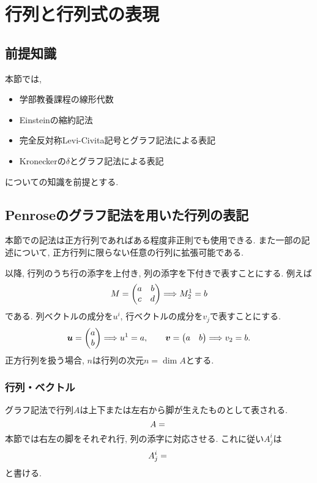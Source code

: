 \documentclass[dvipdfmx]{jsarticle}
\begin{document}
\section{行列と行列式の表現}
\label{sec: matrix}

\subsection{前提知識}

本節では,
\begin{itemize}
    \item 学部教養課程の線形代数
    \item Einsteinの縮約記法
    \item 完全反対称Levi-Civita記号とグラフ記法による表記
    \item Kroneckerの$\delta$とグラフ記法による表記
\end{itemize}
についての知識を前提とする.


\subsection{Penroseのグラフ記法を用いた行列の表記}
\label{sec: matrix: display of matrix}

本節での記法は正方行列であればある程度非正則でも使用できる.
また一部の記述について, 正方行列に限らない任意の行列に拡張可能である.

以降, 行列のうち行の添字を上付き, 列の添字を下付きで表すことにする.
例えば
\begin{align*}
    M=\mqty(a&b\\c&d)\Longrightarrow M^1_2=b
\end{align*}
である.
列ベクトルの成分を$u^i$, 行ベクトルの成分を$v_j$で表すことにする.
\begin{equation*}
    \bm{u}
    =
    \mqty(a\\b)
    \Longrightarrow
    u^1=a,
    \qquad
    \bm{v}
    =
    \mqty(a&b)
    \Longrightarrow
    v_2=b.
\end{equation*}
正方行列を扱う場合, $n$は行列の次元$n=\dim A$とする.



\subsubsection{行列・ベクトル}

グラフ記法で行列$A$は上下または左右から脚が生えたものとして表される.
\begin{equation*}
    A=
    \vcenter{\hbox{}}
\end{equation*}
本節では右左の脚をそれぞれ行, 列の添字に対応させる.
これに従い$A^i_j$は
\begin{equation*}
    A^i_j
    =
    \vcenter{\hbox{}}
\end{equation*}
と書ける.
\end{document}
